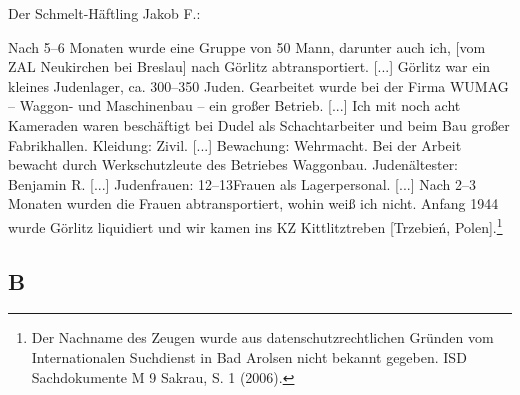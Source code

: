 Der Schmelt-Häftling Jakob F.:
\begin{leftbar}
Nach 5--6 Monaten wurde eine Gruppe von 50 Mann, darunter auch ich, [vom ZAL Neukirchen bei Breslau] nach Görlitz abtransportiert. [...] Görlitz war ein kleines Judenlager, ca. 300--350 Juden. Gearbeitet wurde bei der Firma WUMAG -- Waggon- und Maschinenbau -- ein großer Betrieb. [...] Ich mit noch acht Kameraden waren beschäftigt bei Dudel als Schachtarbeiter und beim Bau großer Fabrikhallen. Kleidung: Zivil. [...] Bewachung: Wehrmacht. Bei der Arbeit bewacht durch Werkschutzleute des Betriebes Waggonbau. Judenältester: Benjamin R. [...] Judenfrauen: 12--13Frauen als Lagerpersonal. [...] Nach 2--3 Monaten wurden die Frauen abtransportiert, wohin weiß ich nicht. Anfang 1944 wurde Görlitz liquidiert und wir kamen ins KZ Kittlitztreben [Trzebień, Polen].\footnote{Der Nachname des Zeugen wurde aus datenschutzrechtlichen Gründen vom Internationalen Suchdienst in Bad Arolsen nicht bekannt gegeben. ISD Sachdokumente M 9 Sakrau, S. 1 (2006).}
\end{leftbar}


\subsection{B}

